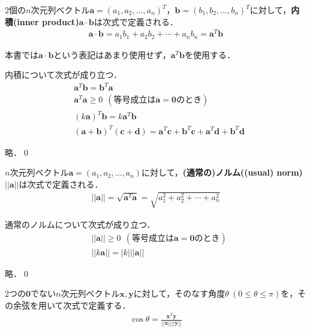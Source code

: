 \begin{defi}[内積]
2個の$n$次元列ベクトル${\bm a}=(a_1,a_2,\ldots,a_n)^T$，${\bm b}=(b_1,b_2,\ldots,b_n)^T$に対して，{\bf 内積(inner product)}${\bm a}\cdot {\bm b}$は次式で定義される．	
\begin{align}
{\bm a}\cdot {\bm b} = a_1b_1+a_2b_2+\cdots+a_nb_n = {\bm a}^T {\bm b} \label{IP}
\end{align}
\end{defi}
\begin{rem}
本書では${\bm a}\cdot {\bm b}$という表記はあまり使用せず，${\bm a}^T{\bm b}$を使用する．	
\end{rem}

\begin{theo}
内積について次式が成り立つ．
\begin{align}
&{\bm a}^T{\bm b}= {\bm b}^T{\bm a}	\\
&{\bm a}^T{\bm a} \geq 0~~(等号成立は{\bm a}={\bm 0}のとき)\\
&(k{\bm a})^T{\bm b}= k{\bm a}^T{\bm b} \\
&({\bm a}+{\bm b})^T({\bm c}+{\bm d})= {\bm a}^T{\bm c}+{\bm b}^T{\bm c}+{\bm a}^T{\bm d}+{\bm b}^T{\bm d}
\end{align}
\end{theo}
\begin{pro}
略．\qed	
\end{pro}

\begin{defi}
$n$次元列ベクトル${\bm a}=(a_1,a_2,\ldots,a_n)$に対して，{\bf (通常の)ノルム((usual) norm)}$||{\bm a}||$は次式で定義される．
\begin{align}
	||{\bm a}||=\sqrt{{\bm a}^T{\bm a}}=\sqrt{a_1^2+a_2^2+\cdots +a_n^2}
\end{align}
\end{defi}

\begin{theo}
通常のノルムについて次式が成り立つ．
\begin{align}
&||{\bm a}|| \geq 0~~(等号成立は{\bm a}={\bm 0}のとき)\\
&||k{\bm a}|| = |k|||{\bm a}||	
\end{align}
\end{theo}
\begin{pro}
略．\qed	
\end{pro}

\begin{defi}[角度]
2つの${\bm 0}$でない$n$次元列ベクトル${\bm x},{\bm y}$に対して，そのなす角度$\theta~(0\leq \theta \leq \pi)$を，その余弦を用いて次式で定義する．
\begin{align}
\cos \theta = \frac{{\bm x}^T{\bm y}}{||{\bm x}||||{\bm y}||}	
\end{align}	
\end{defi}

